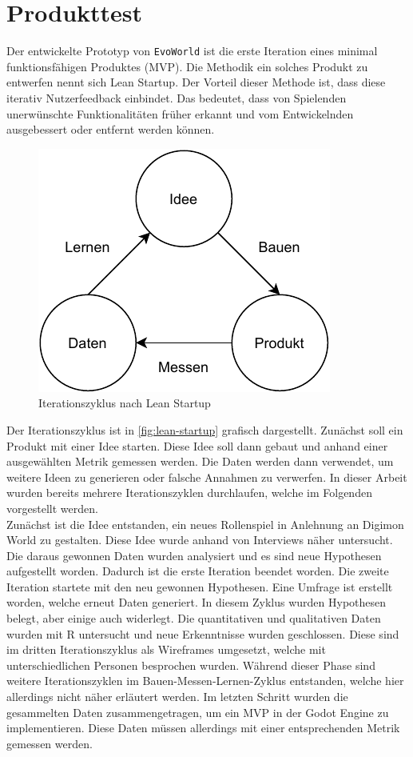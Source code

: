 \section{Produkttest}\label{sec:testing}
Der entwickelte Prototyp von \texttt{EvoWorld} ist die erste Iteration eines minimal funktionsfähigen Produktes (\ac{MVP}).
Die Methodik ein solches Produkt zu entwerfen nennt sich Lean Startup\cite{lean-startup}.
Der Vorteil dieser Methode ist, dass diese iterativ Nutzerfeedback einbindet.
Das bedeutet, dass von Spielenden unerwünschte Funktionalitäten früher erkannt und vom Entwickelnden ausgebessert oder entfernt werden können. \\

\begin{figure}[H]
    \centering
    \includegraphics[width=0.5\columnwidth]{figures/lean-startup.pdf}
    \caption{\label{fig:lean-startup}Iterationszyklus nach Lean Startup}
\end{figure}

Der Iterationszyklus ist in \autoref{fig:lean-startup} grafisch dargestellt\cite[vgl.][S. 75]{lean-startup}.
Zunächst soll ein Produkt mit einer Idee starten.
Diese Idee soll dann gebaut und anhand einer ausgewählten Metrik gemessen werden.
Die Daten werden dann verwendet, um weitere Ideen zu generieren oder falsche Annahmen zu verwerfen.
In dieser Arbeit wurden bereits mehrere Iterationszyklen durchlaufen, welche im Folgenden vorgestellt werden. \\

Zunächst ist die Idee entstanden, ein neues Rollenspiel in Anlehnung an Digimon World zu gestalten.
Diese Idee wurde anhand von Interviews näher untersucht.
Die daraus gewonnen Daten wurden analysiert und es sind neue Hypothesen aufgestellt worden.
Dadurch ist die erste Iteration beendet worden.
Die zweite Iteration startete mit den neu gewonnen Hypothesen.
Eine Umfrage ist erstellt worden, welche erneut Daten generiert.
In diesem Zyklus wurden Hypothesen belegt, aber einige auch widerlegt.
Die quantitativen und qualitativen Daten wurden mit R untersucht und neue Erkenntnisse wurden geschlossen.
Diese sind im dritten Iterationszyklus als Wireframes umgesetzt, welche mit unterschiedlichen Personen besprochen wurden.
Während dieser Phase sind weitere Iterationszyklen im Bauen-Messen-Lernen-Zyklus entstanden, welche hier allerdings nicht näher erläutert werden.
Im letzten Schritt wurden die gesammelten Daten zusammengetragen, um ein \ac{MVP} in der Godot Engine zu implementieren.
Diese Daten müssen allerdings mit einer entsprechenden Metrik gemessen werden. \\

